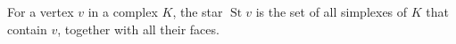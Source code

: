 For a vertex $v$ in a complex $K$, the star $\operatorname{St} v$ is the set of all simplexes of $K$ that contain $v$, together with all their faces.
